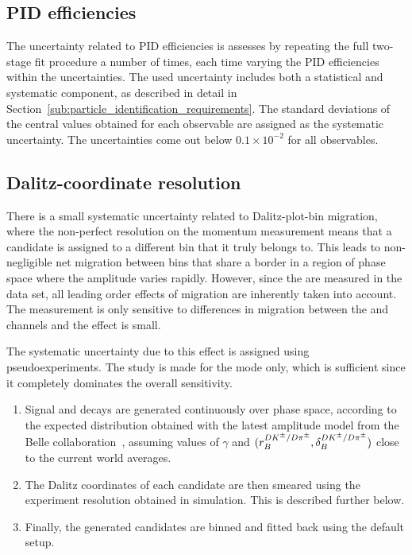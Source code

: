 \subsection{PID efficiencies} %
\label{sub:pid_efficiency_systematic}
The uncertainty related to PID efficiencies is assesses by repeating the full two-stage fit procedure a number of times, each time varying the PID efficiencies within the uncertainties. The used uncertainty includes both a statistical and systematic component, as described in detail in Section~\ref{sub:particle_identification_requirements}. The standard deviations of the central values obtained for each observable are assigned as the systematic uncertainty. The uncertainties come out below $0.1\times 10^{-2}$ for all observables.

\subsection{Dalitz-coordinate resolution} %
\label{sub:dalitz_plot_bin_migration}

There is a small systematic uncertainty related to Dalitz-plot-bin migration, where the non-perfect resolution on the momentum measurement means that a candidate is assigned to a different bin that it truly belongs to. This leads to non-negligible net migration between bins that share a border in a region of phase space where the amplitude varies rapidly. However, since the \Fi are measured in the data set, all leading order effects of migration are inherently taken into account. The measurement is only sensitive to differences in migration between the \DK and \Dpi channels and the effect is small. 

The systematic uncertainty due to this effect is assigned using pseudoexperiments. The study is made for the \DtoKspipi mode only, which is sufficient since it completely dominates the overall sensitivity. 
\begin{enumerate}
    \item Signal \BtoDK and \BtoDpi decays are generated continuously over phase space, according to the expected distribution obtained with the latest amplitude model from the Belle collaboration~\cite{}, assuming values of $\gamma$ and $(r_B^{{{D}{{K}^\pm}}/D\pi^\pm},\delta_B^{{{D}{{K}^\pm}}/D\pi^\pm})$ close to the current world averages.
    \item The Dalitz coordinates of each candidate are then smeared using the experiment resolution obtained in simulation. This is described further below.
    \item Finally, the generated candidates are binned and fitted back using the default setup. 
\end{enumerate}

